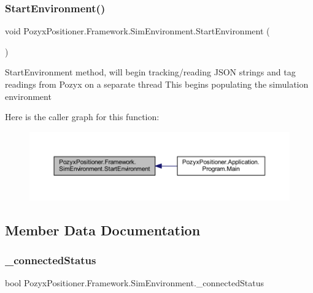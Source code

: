 \subsubsection{\texorpdfstring{Start\+Environment()}{StartEnvironment()}}
{\footnotesize\ttfamily void Pozyx\+Positioner.\+Framework.\+Sim\+Environment.\+Start\+Environment (\begin{DoxyParamCaption}{ }\end{DoxyParamCaption})}



Start\+Environment method, will begin tracking/reading J\+S\+ON strings and tag readings from Pozyx on a separate thread This begins populating the simulation environment 

Here is the caller graph for this function\+:
\nopagebreak
\begin{figure}[H]
\begin{center}
\leavevmode
\includegraphics[width=350pt]{class_pozyx_positioner_1_1_framework_1_1_sim_environment_a0d114a29811d19d1376273cb078f6f61_icgraph}
\end{center}
\end{figure}


\subsection{Member Data Documentation}
\mbox{\label{class_pozyx_positioner_1_1_framework_1_1_sim_environment_a3bfc7c3386466741ac20e20dca73ee33}} 
\subsubsection{\texorpdfstring{\+\_\+connected\+Status}{\_connectedStatus}}
{\footnotesize\ttfamily bool Pozyx\+Positioner.\+Framework.\+Sim\+Environment.\+\_\+connected\+Status\hspace{0.3cm}{\ttfamily [private]}}

